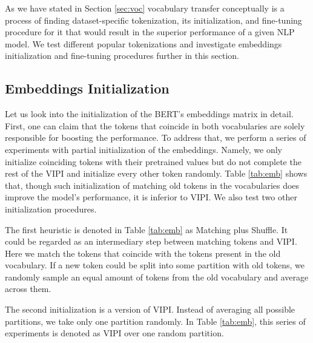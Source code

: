 \documentclass[review]{elsarticle}
\begin{document}
As we have stated in Section \ref{sec:voc} vocabulary transfer conceptually is a process of finding dataset-specific tokenization, its initialization, and fine-tuning procedure for it that would result in the superior performance of a given NLP model. We test different popular tokenizations and investigate embeddings initialization and fine-tuning procedures further in this section. 

\subsection{Embeddings Initialization}

Let us look into the initialization of the BERT's embeddings matrix in detail. First, one can claim that the tokens that coincide in both vocabularies are solely responsible for boosting the performance. To address that, we perform a series of experiments with partial initialization of the embeddings. Namely, we only initialize coinciding tokens with their pretrained values but do not complete the rest of the VIPI and initialize every other token randomly. Table \ref{tab:emb} shows that, though such initialization of matching old tokens in the vocabularies does improve the model's performance, it is inferior to VIPI. We also test two other initialization procedures. 

The first heuristic is denoted in Table \ref{tab:emb} as Matching plus Shuffle. It could be regarded as an intermediary step between matching tokens and VIPI. Here we match the tokens that coincide with the tokens present in the old vocabulary. If a new token could be split into some partition with old tokens, we randomly sample an equal amount of tokens from the old vocabulary and average across them. 

The second initialization is a version of VIPI. Instead of averaging all possible partitions, we take only one partition randomly. In Table \ref{tab:emb}, this series of experiments is denoted as VIPI over one random partition.
\end{document}

